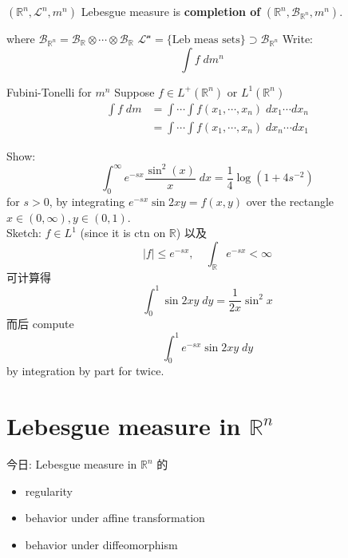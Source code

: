 \documentclass[lang=cn,11pt]{elegantbook}
\begin{document}
\begin{definition}
    $(\mathbb{R}^n, \mathcal{L}^n, m^n)$ Lebesgue measure is \textbf{completion of } $(\mathbb{R}^n, \mathcal{B}_{\mathbb{R}^n}, m^n)$. 
\end{definition}
where $ \mathcal{B}_{\mathbb{R}^n} =  \mathcal{B}_{\mathbb{R}} \otimes \cdots \otimes \mathcal{B}_{\mathbb{R}}  $
\(\mathcal{L^n }  = \{ \text{Leb meas sets} \}  \supset  \mathcal{B}_{\mathbb{R}^n}\)
Write: \[  \int f \;d m^n   \quad 
\]


\begin{theorem}{Fubini-Tonelli for $m^n$}
    Suppose $f \in L^+(\mathbb{R}^n)$ or $L^1(\mathbb{R}^n)$
\begin{align}
\int f \; dm &= \int \cdots \int f(x_1, \cdots, x_n) 
\; dx_1 \cdots dx_n        \\
& = \int \cdots \int f(x_1, \cdots, x_n) 
\; dx_n \cdots dx_1
\end{align}
\end{theorem}

\begin{example}
    Show: \[
    \int_0^\infty e^{-sx} \frac{\sin^2(x)}{x} \; dx = \frac{1}{4} \log(1+ 4s^{-2})
    \]
for $s > 0$, by integrating $e^{-sx} \sin 2xy = f(x,y)$ over the rectangle $x \in (0,\infty), y \in (0,1)$.\\
Sketch: $f \in L^1$ (since it is ctn on $\mathbb{R}$)
以及 \[
|f| \leq e^{-sx}, \quad \int_{\mathbb{R}} e^{-sx} < \infty
\]
可计算得 \[
\int_0 ^1 \sin 2xy \; dy = \frac{1}{2x} \sin^2 x
\]
而后 compute \[
\int_0 ^1    e^{-sx} \sin 2xy \; dy
\] by integration by part for twice.
\end{example}




\chapter{Lebesgue measure in $\mathbb{R}^n$}
今日: Lebesgue measure in $\mathbb{R}^n$ 的 \begin{itemize}
    \item regularity
    \item behavior under affine transformation
    \item behavior under diffeomorphism
\end{itemize}
\end{document}
